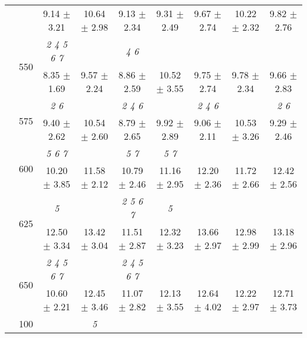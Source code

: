 \begin{table}[h]
{\begin{tabular}{
        ccccccccc}
 & & \cellcolor[HTML]{EFEFEF} 9.14 $\pm$ 3.21& \cellcolor[HTML]{EFEFEF} 10.64 $\pm$ 2.98& \cellcolor[HTML]{EFEFEF} 9.13 $\pm$ 2.34& \cellcolor[HTML]{EFEFEF} 9.31 $\pm$ 2.49& \cellcolor[HTML]{EFEFEF} 9.67 $\pm$ 2.74& \cellcolor[HTML]{EFEFEF} 10.22 $\pm$ 2.32& \cellcolor[HTML]{EFEFEF} 9.82 $\pm$ 2.76 \\ 
 & \multirow{2}{*}{550}& \textit{ 2 4 5 6 7 }& & \textit{ 4 6 }& & & &  \\ 
 & & 8.35 $\pm$ 1.69& 9.57 $\pm$ 2.24& 8.86 $\pm$ 2.59& 10.52 $\pm$ 3.55& 9.75 $\pm$ 2.74& 9.78 $\pm$ 2.34& 9.66 $\pm$ 2.83 \\ 
 & \multirow{2}{*}{575}& \cellcolor[HTML]{EFEFEF} \textit{ 2 6 }& \cellcolor[HTML]{EFEFEF} & \cellcolor[HTML]{EFEFEF} \textit{ 2 4 6 }& \cellcolor[HTML]{EFEFEF} & \cellcolor[HTML]{EFEFEF} \textit{ 2 4 6 }& \cellcolor[HTML]{EFEFEF} & \cellcolor[HTML]{EFEFEF} \textit{ 2 6 } \\ 
 & & \cellcolor[HTML]{EFEFEF} 9.40 $\pm$ 2.62& \cellcolor[HTML]{EFEFEF} 10.54 $\pm$ 2.60& \cellcolor[HTML]{EFEFEF} 8.79 $\pm$ 2.65& \cellcolor[HTML]{EFEFEF} 9.92 $\pm$ 2.89& \cellcolor[HTML]{EFEFEF} 9.06 $\pm$ 2.11& \cellcolor[HTML]{EFEFEF} 10.53 $\pm$ 3.26& \cellcolor[HTML]{EFEFEF} 9.29 $\pm$ 2.46 \\ 
 & \multirow{2}{*}{600}& \textit{ 5 6 7 }& & \textit{ 5 7 }& \textit{ 5 7 }& & &  \\ 
 & & 10.20 $\pm$ 3.85& 11.58 $\pm$ 2.12& 10.79 $\pm$ 2.46& 11.16 $\pm$ 2.95& 12.20 $\pm$ 2.36& 11.72 $\pm$ 2.66& 12.42 $\pm$ 2.56 \\ 
 & \multirow{2}{*}{625}& \cellcolor[HTML]{EFEFEF} \textit{ 5 }& \cellcolor[HTML]{EFEFEF} & \cellcolor[HTML]{EFEFEF} \textit{ 2 5 6 7 }& \cellcolor[HTML]{EFEFEF} \textit{ 5 }& \cellcolor[HTML]{EFEFEF} & \cellcolor[HTML]{EFEFEF} & \cellcolor[HTML]{EFEFEF}  \\ 
 & & \cellcolor[HTML]{EFEFEF} 12.50 $\pm$ 3.34& \cellcolor[HTML]{EFEFEF} 13.42 $\pm$ 3.04& \cellcolor[HTML]{EFEFEF} 11.51 $\pm$ 2.87& \cellcolor[HTML]{EFEFEF} 12.32 $\pm$ 3.23& \cellcolor[HTML]{EFEFEF} 13.66 $\pm$ 2.97& \cellcolor[HTML]{EFEFEF} 12.98 $\pm$ 2.99& \cellcolor[HTML]{EFEFEF} 13.18 $\pm$ 2.96 \\ 
 & \multirow{2}{*}{650}& \textit{ 2 4 5 6 7 }& & \textit{ 2 4 5 6 7 }& & & &  \\ 
 & & 10.60 $\pm$ 2.21& 12.45 $\pm$ 3.46& 11.07 $\pm$ 2.82& 12.13 $\pm$ 3.55& 12.64 $\pm$ 4.02& 12.22 $\pm$ 2.97& 12.71 $\pm$ 3.73 \\ \midrule 
 & \multirow{2}{*}{100}& & \textit{ 5 }& & & & &  \\ 

\end{tabular}}
\end{table}
